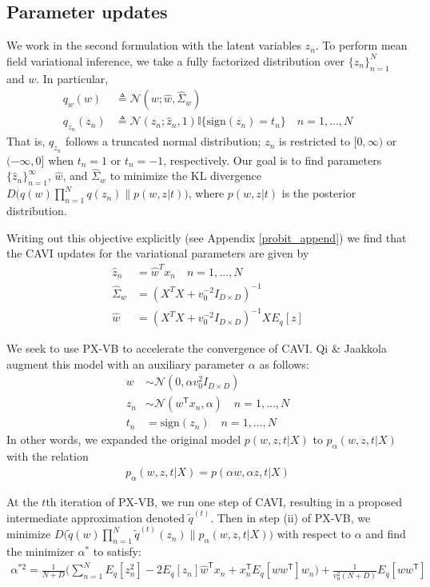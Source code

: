 \documentclass{article}
\begin{document}
\subsection{Parameter updates}
We work in the second formulation with the latent variables $z_n$. To perform mean field variational inference, we take a fully factorized distribution over $\{z_n\}_{n=1}^N$ and $w$. In particular, 
\begin{align}
    q_w(w) &\triangleq \mathcal N (w;\hat w, \hat\Sigma_w)\\
    q_{z_n}(z_n) &\triangleq \mathcal{N}(z_n;\hat z_n, 1)\mathbb I\{\text{sign}(z_n) = t_n\} \quad n = 1, ..., N
\end{align}
That is, $q_{z_n}$ follows a truncated normal distribution; $z_n$ is restricted to $[0,\infty)$ or $(-\infty,  0]$ when $t_n=1$ or $t_n=-1$, respectively. Our goal is to find parameters $\{\hat z_n\}_{n=1}^\infty$, $\hat w$, and $\hat\Sigma_w$ to minimize the KL divergence $D\big(q(w) \prod_{n=1}^N q(z_n)\|p(w, z| t)\big)$, where $p(w,z|t)$ is the posterior distribution. 

Writing out this objective explicitly (see Appendix \ref{probit_append}) we find that the CAVI updates for the variational parameters are given by 
\begin{align}
    \hat z_n &= \hat w^T x_n \quad n = 1, ..., N\\
    \hat \Sigma_w &= (X^T X + v_0^{-2} I_{D\times D})^{-1}\\
    \hat w &= (X^T X + v_0^{-2} I_{D\times D})^{-1} XE_q[z]
\end{align}

We seek to use PX-VB to accelerate the convergence of CAVI. Qi \& Jaakkola \cite{Qi} augment this model with an auxiliary parameter $\alpha$ as follows: 
\begin{align}
    w &\sim \mathcal N (0, \alpha v_0^2I_{D\times D}) \\
    z_n &\sim \mathcal N (w^\mathsf T x_n, \alpha)\quad n = 1, ..., N \\
    t_n &= \text{sign}(z_n) \quad n = 1, ..., N
\end{align}
In other words, we expanded the original model $p(w,z,t|X)$ to $p_\alpha(w,z,t|X)$ with the relation
\begin{align}
   p_\alpha(w,z,t|X) = p(\alpha w, \alpha z, t|X)
\end{align}

At the $t$th iteration of PX-VB, we run one step of CAVI, resulting in a proposed intermediate approximation denoted $\tilde q^{(t)}$. Then in step (ii) of PX-VB, we minimize $D\big(\tilde q(w) \prod_{n=1}^N \tilde q^{(t)}(z_n) \| p_\alpha(w,z,t|X) \big)$ with respect to $\alpha$ and find the minimizer $\alpha^*$ to satisfy: 
\begin{align}
    \alpha^{*2} = \frac{1}{N+D} \Big(\sum_{n=1}^N E_q[z_n^2] - 2E_q[z_n] \hat w^\mathsf Tx_n + x_n^\mathsf T E_q[w w^\mathsf T] w_n\Big) + \frac{1}{v_0^2(N+D)} E_q[w w^\mathsf T]
\end{align}
\end{document}
